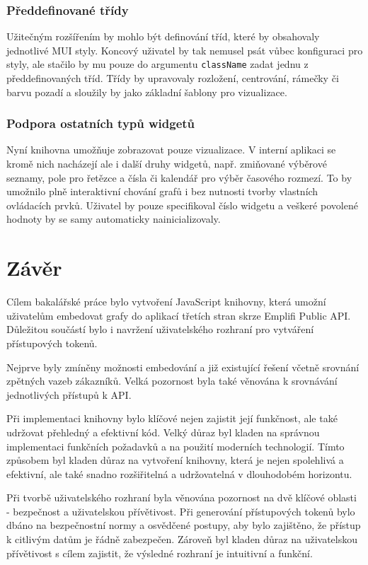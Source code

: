 \documentclass[czech, bc, kiv, he, iso690numb]{fasthesis}
\begin{document}
\subsection{Předdefinované třídy}
Užitečným rozšířením by mohlo být definování tříd, které by obsahovaly jednotlivé MUI styly. Koncový uživatel by tak nemusel psát vůbec konfiguraci pro styly,
ale stačilo by mu pouze do argumentu \texttt{className} zadat jednu z předdefinovaných tříd. Třídy by upravovaly rozložení, centrování, rámečky či barvu pozadí a sloužily
by jako základní šablony pro vizualizace.

\subsection{Podpora ostatních typů widgetů}
Nyní knihovna umožňuje zobrazovat pouze vizualizace. V interní aplikaci se kromě nich nacházejí ale i další druhy widgetů, např. zmiňované výběrové seznamy,
pole pro řetězce a čísla či kalendář pro výběr časového rozmezí. To by umožnilo plně interaktivní chování grafů i bez nutnosti tvorby vlastních ovládacích prvků.
Uživatel by pouze specifikoval číslo widgetu a veškeré povolené hodnoty by se samy automaticky nainicializovaly.


%
%
%
%
\chapter{Závěr}
Cílem bakalářské práce bylo vytvoření JavaScript knihovny, která umožní uživatelům embedovat grafy do aplikací třetích stran skrze
Emplifi Public API. Důležitou součástí bylo i navržení uživatelského rozhraní pro vytváření přístupových tokenů.

Nejprve byly zmíněny možnosti embedování a již existující řešení včetně srovnání zpětných vazeb zákazníků. Velká pozornost byla také
věnována k srovnávání jednotlivých přístupů k API.

Při implementaci knihovny bylo klíčové nejen zajistit její funkčnost, ale také udržovat přehledný a efektivní kód.
Velký důraz byl kladen na správnou implementaci funkčních požadavků a na použití moderních technologií. 
Tímto způsobem byl kladen důraz na vytvoření knihovny, která je nejen spolehlivá a efektivní, ale také snadno rozšiřitelná a udržovatelná v dlouhodobém horizontu.

Při tvorbě uživatelského rozhraní byla věnována pozornost na dvě klíčové oblasti - bezpečnost a uživatelskou přívětivost. Při generování přístupových tokenů bylo dbáno na
bezpečnostní normy a osvědčené postupy, aby bylo zajištěno, že přístup k citlivým datům je řádně zabezpečen. 
Zároveň byl kladen důraz na uživatelskou přívětivost s cílem zajistit, že výsledné rozhraní je intuitivní a funkční.
\end{document}
